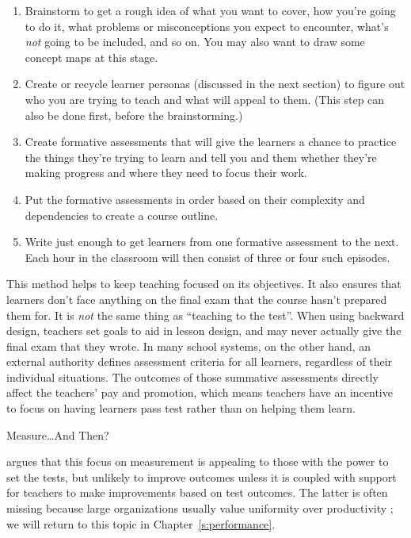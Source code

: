\begin{enumerate}
\item
  Brainstorm to get a rough idea of what you want to cover, how
  you're going to do it, what problems or misconceptions you expect
  to encounter, what's \emph{not} going to be included, and so on. You may
  also want to draw some concept maps at this stage.
\item
  Create or recycle learner personas (discussed in the next section)
  to figure out who you are trying to teach and what will appeal to
  them. (This step can also be done first, before the brainstorming.)
\item
  Create formative assessments that will give the learners a chance
  to practice the things they're trying to learn and tell you and
  them whether they're making progress and where they need to focus
  their work.
\item
  Put the formative assessments in order based on their complexity
  and dependencies to create a course outline.
\item
  Write just enough to get learners from one formative assessment to
  the next. Each hour in the classroom will then consist of three or
  four such episodes.
\end{enumerate}

This method helps to keep teaching focused on its objectives. It also
ensures that learners don't face anything on the final exam that the
course hasn't prepared them for. It is \emph{not} the same thing as
``teaching to the test''. When using backward design, teachers set goals
to aid in lesson design, and may never actually give the final exam
that they wrote. In many school systems, on the other hand, an
external authority defines assessment criteria for all learners,
regardless of their individual situations. The outcomes of those
summative assessments directly affect the teachers' pay and promotion,
which means teachers have an incentive to focus on having learners
pass test rather than on helping them learn.

\begin{aside}{Measure{\ldots}And Then?}

\cite{Gree2014} argues that this focus on measurement is
appealing to those with the power to set the tests, but unlikely to
improve outcomes unless it is coupled with support for teachers to
make improvements based on test outcomes. The latter is often
missing because large organizations usually value uniformity over
productivity \cite{Scot1998}; we will return to this topic in
Chapter~\ref{s:performance}.

\end{aside}

